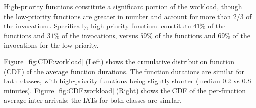 High-priority functions constitute a significant portion of the workload, though the low-priority functions are greater in number and account for more than 2/3 of the invocations.
Specifically, high-priority functions constitute $41\%$ of the functions and $31\%$ of the invocations, versus $59\%$ of the functions and $69\%$ of the invocations for the low-priority.

Figure~\ref{fig:CDF:workload} (Left) shows the cumulative distribution function (CDF) of the average function durations.
The function durations are similar for both classes, with high-priority functions being slightly shorter (median 0.2 vs 0.8 minutes).
Figure~\ref{fig:CDF:workload} (Right) shows the CDF of the per-function average inter-arrivals;
the IATs for both classes are similar.



